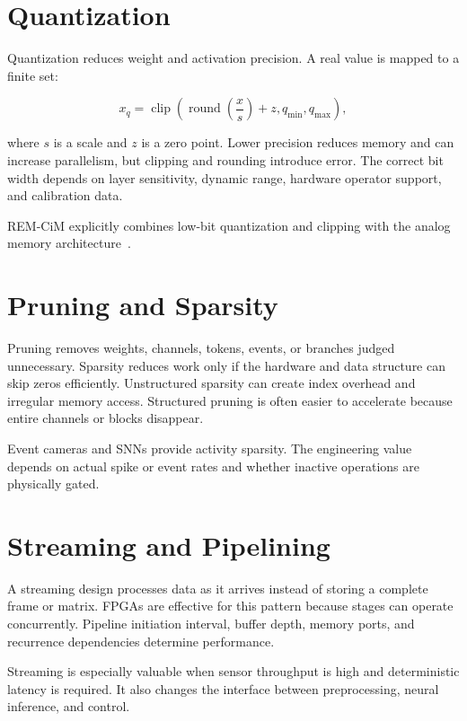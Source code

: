 \section{Quantization}

Quantization reduces weight and activation precision. A real value is mapped to a finite set:

\[
    x_q = \operatorname{clip}\!\left(
        \operatorname{round}\left(\frac{x}{s}\right)+z,
        q_{\min},q_{\max}
    \right),
\]

where \(s\) is a scale and \(z\) is a zero point. Lower precision reduces memory and can increase parallelism, but clipping and rounding introduce error. The correct bit width depends on layer sensitivity, dynamic range, hardware operator support, and calibration data.

REM-CiM explicitly combines low-bit quantization and clipping with the analog memory architecture~\cite{ichikawa2024remcim}.

\section{Pruning and Sparsity}

Pruning removes weights, channels, tokens, events, or branches judged unnecessary. Sparsity reduces work only if the hardware and data structure can skip zeros efficiently. Unstructured sparsity can create index overhead and irregular memory access. Structured pruning is often easier to accelerate because entire channels or blocks disappear.

Event cameras and SNNs provide activity sparsity. The engineering value depends on actual spike or event rates and whether inactive operations are physically gated.

\section{Streaming and Pipelining}

A streaming design processes data as it arrives instead of storing a complete frame or matrix. FPGAs are effective for this pattern because stages can operate concurrently. Pipeline initiation interval, buffer depth, memory ports, and recurrence dependencies determine performance.

Streaming is especially valuable when sensor throughput is high and deterministic latency is required. It also changes the interface between preprocessing, neural inference, and control.

